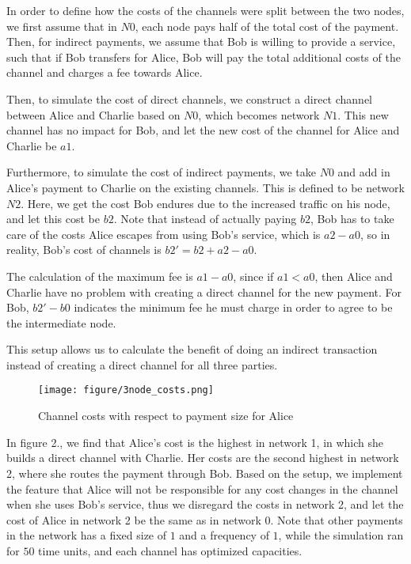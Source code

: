 \documentclass[twocolumn,10pt]{report}
\begin{document}
In order to define how the costs of the channels were split between the two nodes, we first assume that in $N0$, each node pays half of the total cost of the payment. Then, for indirect payments, we assume that Bob is willing to provide a service, such that if Bob transfers for Alice, Bob will pay the total additional costs of the channel and charges a fee towards Alice.

Then, to simulate the cost of direct channels, we construct a direct channel between Alice and Charlie based on $N0$, which becomes network $N1$. This new channel has no impact for Bob, and let the new cost of the channel for Alice and Charlie be $a1$. 

Furthermore, to simulate the cost of indirect payments, we take $N0$ and add in Alice's payment to Charlie on the existing channels. This is defined to be network $N2$. Here, we get the cost Bob endures due to the increased traffic on his node, and let this cost be $b2$. Note that instead of actually paying $b2$, Bob has to take care of the costs Alice escapes from using Bob's service, which is $a2-a0$, so in reality, Bob's cost of channels is $b2'=b2+a2-a0$.

The calculation of the maximum fee is $a1-a0$, since if $a1<a0$, then Alice and Charlie have no problem with creating a direct channel for the new payment. For Bob, $b2'-b0$ indicates the minimum fee he must charge in order to agree to be the intermediate node. 

This setup allows us to calculate the benefit of doing an indirect transaction instead of creating a direct channel for all three parties. 
\begin{figure}[t]
    \begin{center}
    \setlength{\unitlength}{0.012500in}%
    \texttt{[image: figure/3node\_costs.png]}
    \end{center}
    \caption{Channel costs with respect to payment size for Alice}
    \label{figure_3Node2} 
\end{figure}

In figure 2., we find that  Alice's cost is the highest in network 1, in which she builds a direct channel with Charlie. Her costs are the second highest in network 2, where she routes the payment through Bob. Based on the setup, we implement the feature that Alice will not be responsible for any cost changes in the channel when she uses Bob's service, thus we disregard the costs in network 2, and let the cost of Alice in network 2 be the same as in network 0. Note that other payments in the network has a fixed size of $1$ and a frequency of $1$, while the simulation ran for $50$ time units, and each channel has optimized capacities. 
\end{document}
